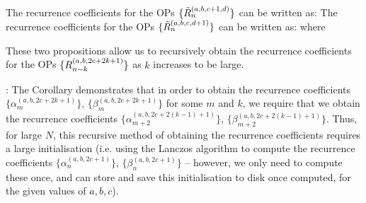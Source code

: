 \begin{corollary}
The recurrence coefficients for the OPs $\{\tilde{R}_n^{(a,b,c+1,d)}\}$ can be written as:
The recurrence coefficients for the OPs $\{\tilde{R}_n^{(a,b,c,d+1)}\}$ can be written as:
where 
\end{corollary}

These two propositions allow us to recursively obtain the recurrence coefficients for the OPs $\{R_{n-k}^{(a,b,2c+2k + 1)}\}$ as $k$ increases to be large. 

:
The Corollary demonstrates that in order to obtain the recurrence coefficients $\{\alpha_{m}^{(a,b,2c+2k+1)}\}$, $\{\beta_{m}^{(a,b,2c+2k+1)}\}$ for some $m$ and $k$, we require that we obtain the recurrence coefficients $\{\alpha_{m+2}^{(a,b,2c+2(k-1)+1)}\}$, $\{\beta_{m+2}^{(a,b,2c+2(k-1)+1)}\}$. Thus, for large $N$, this recursive method of obtaining the recurrence coefficients requires a large initialisation (i.e. using the Lanczos algorithm to compute the recurrence coefficients $\{\alpha_{n}^{(a,b,2c+1)}\}$, $\{\beta_{n}^{(a,b,2c+1)}\}$ -- however, we only need to compute these once, and can store and save this initialisation to disk once computed, for the given values of $a, b, c$). 

